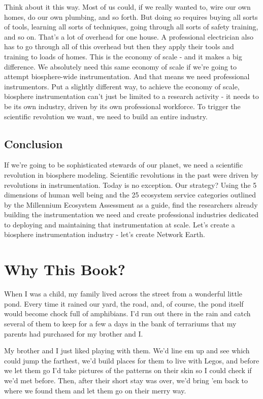\documentclass[11pt]{book}
\begin{document}
Think about it this way. Most of us could, if we really wanted to, wire our own homes, do our own plumbing, and so forth. But doing so requires buying all sorts of tools, learning all sorts of techniques, going through all sorts of safety training, and so on. That's a lot of overhead for one house. A professional electrician also has to go through all of this overhead but then they apply their tools and training to loads of homes. This is the economy of scale - and it makes a big difference. We absolutely need this same economy of scale if we're going to attempt biosphere-wide instrumentation. And that means we need professional instrumentors. Put a slightly different way, to achieve the economy of scale, biosphere instrumentation can't just be limited to a research activity - it needs to be its own industry, driven by its own professional workforce. To trigger the scientific revolution we want, we need to build an entire industry.
\newline

\section{Conclusion}

If we're going to be sophisticated stewards of our planet, we need a scientific revolution in biosphere modeling. Scientific revolutions in the past were driven by revolutions in instrumentation. Today is no exception. Our strategy? Using the 5 dimensions of human well being and the 25 ecosystem service categories outlined by the Millennium Ecosystem Assessment as a guide, find the researchers already building the instrumentation we need and create professional industries dedicated to deploying and maintaining that instrumentation at scale. Let's create a biosphere instrumentation industry - let's create Network Earth.

\chapter{Why This Book?}
When I was a child, my family lived across the street from a wonderful little pond. Every time it rained our yard, the road, and, of course, the pond itself would become chock full of amphibians. I'd run out there in the rain and catch several of them to keep for a few a days in the bank of terrariums that my parents had purchased for my brother and I.
\newline

My brother and I just liked playing with them. We'd line em up and see which could jump the farthest, we'd build places for them to live with Legos, and before we let them go I'd take pictures of the patterns on their skin so I could check if we'd met before. Then, after their short stay was over, we'd bring 'em back to where we found them and let them go on their merry way.
\newline
\end{document}
